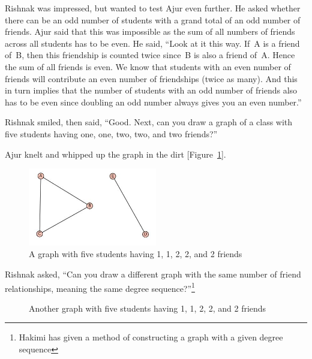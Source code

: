 Rishnak was impressed, but wanted to test Ajur even further. He asked whether there can be an odd number of students with a grand total of an odd number of friends. Ajur said that this was impossible as the sum of all numbers of friends across all students has to be even. He said, ``Look at it this way. If~A is a friend of~B, then this friendship is counted twice since~B is also a friend of~A. Hence the sum of all friends is even. We know that students with an even number of friends will contribute an even number of friendships (twice as many). And this in turn implies that the number of students with an odd number of friends also has to be even since doubling an odd number always gives you an even number.''

Rishnak smiled, then said, ``Good. Next, can you draw a graph of a class with five students having one, one, two, two, and two friends?''

Ajur knelt and whipped up the graph in the dirt [Figure~\ref{dg3}].

\begin{figure}
\begin{center}
\includegraphics[width=0.5\textwidth]{graphstory1-2.JPG}
\caption{A graph with five students having 1, 1, 2, 2, and 2 friends}\label{dg3}
\end{center}
\end{figure}

Rishnak asked, ``Can you draw a different graph with the same number of friend relationships, meaning the same degree sequence?''\footnote{Hakimi has given a method of constructing a graph with a given degree sequence}

\begin{figure}
\begin{center}
\caption{Another graph with five students having 1, 1, 2, 2, and 2 friends}\label{dg4}
\end{center}
\end{figure}

